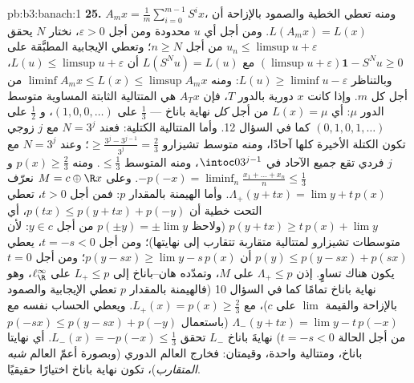 \begin{solution}{pb:b3:banach:1}
\textbf{25.} $A_mx = \frac1m\sum_{i=0}^{m-1}S^ix$، ومنه تعطي الخطية والصمود بالإزاحة أن
$L(A_mx) = L(x)$. ومن أجل أي $u$ محدودة ومن أجل $\varepsilon > 0$، نختار
$N$ يحقق $u_n \leq
\limsup u + \varepsilon$ من أجل $n \geq N$؛ وتعطي الإيجابية المطبَّقة
على $(\limsup u + \varepsilon)\mathbf 1 - S^Nu \geq 0$ مع $L(S^Nu) = L(u)$ أن $L(u) \leq \limsup u + \varepsilon$، وبالتناظر $L(u) \geq \liminf u - \varepsilon$:
ومنه $\liminf A_mx \leq L(x) \leq \limsup A_mx$ من أجل كل $m$. وإذا كانت $x$ دورية بالدور $T$،
فإن $A_Tx$ هي المتتالية الثابتة المساوية متوسط الدور $\mu$:
أي $L(x) = \mu$ من أجل \emph{كل} نهاية باناخ --- $\frac13$ على
$(1,0,0,\dots)$، و $\frac12$ على $(0,1,0,1,\dots)$ كما في السؤال 12. وأما
المتتالية الكتلية: فعند $N = 3^j$ مع $j$ زوجي تكون الكتلة
الأخيرة كلها آحادًا، ومنه متوسط تشيزارو $\geq \frac{3^j - 3^{j-1}}{3^j} = \frac23$؛ وعند
$N = 3^j$ مع $j$ فردي تقع جميع الآحاد في $\intoc0
{3^{j-1}}$، ومنه المتوسط
$\leq \frac13$. ومنه $p(x) \geq
\frac23$ و $-p(-x) = \liminf_n\frac{x_1 + \dots + x_n}n
\leq \frac13$. وعلى $M = c \oplus \R x$ نعرّف
$\Lambda_+(y +
tx) = \lim y + t\,p(x)$. وأما الهيمنة بالمقدار $p$: فمن أجل $t > 0$، تعطي
التحت خطية أن $p(tx) \leq p(y + tx) + p(-y)$، أي $p(y + tx) \geq t\,p(x) + \lim y$ (ولاحظ $p(\pm y) = \pm\lim
y$ من أجل
$y \in c$: لأن متوسطات تشيزارو لمتتالية متقاربة تتقارب إلى
نهايتها)؛ ومن أجل $t = -s < 0$، يعطي $p(y) \leq p(y -
sx) + p(sx)$ أن $p(y - sx) \geq \lim y - s\,p(x)$؛ ومن
أجل $t
= 0$ يكون هناك تساوٍ. إذن $\Lambda_+ \leq p$ على $M$، وتمدّده
هان--باناخ إلى $L_+ \leq p$ على $\ell^\infty_\R$، وهو نهاية
باناخ تمامًا كما في السؤال 10 (فالهيمنة بالمقدار $p$ تعطي
الإيجابية والصمود بالإزاحة والقيمة $\lim$ على $c$)، مع $L_+(x) = p(x) \geq \frac23$.
ويعطي الحساب نفسه مع $\Lambda_-(y + tx) = \lim y - t\,p(-x)$ (باستعمال $p(-sx) \leq p(y - sx) + p(-y)$ من أجل الحالة
$t = -s
< 0$) نهايةَ باناخ $L_-$ تحقق $L_-(x) = -p(-x) \leq
\frac13$. أي نهايتا باناخ،
ومتتالية واحدة، وقيمتان: فخارج العالم الدوري (وبصورة أعمّ
العالم \emph{شبه المتقارب})، تكون نهاية باناخ اختيارًا حقيقيًا.
\end{solution}
